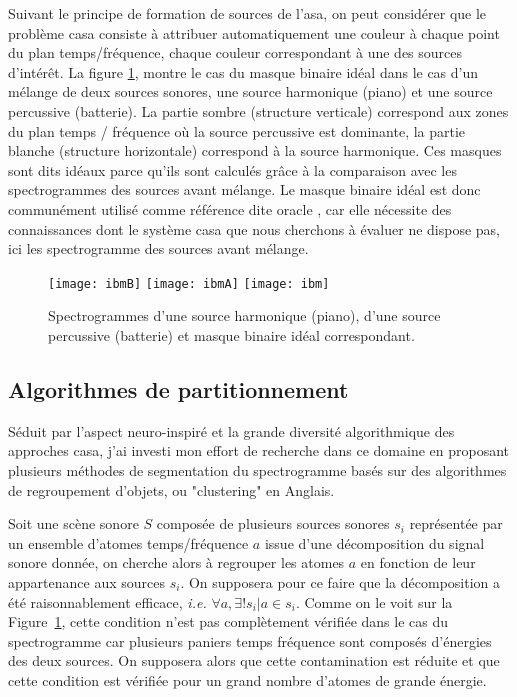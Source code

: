 Suivant le principe de formation de sources de l'asa, on peut considérer que le problème casa consiste à attribuer automatiquement une couleur à chaque point du plan temps/fréquence, chaque couleur correspondant à une des sources d'intérêt. La figure \ref{fig:ibm}, montre le cas du masque binaire idéal dans le cas d'un mélange de deux sources sonores, une source harmonique (piano) et une source percussive (batterie). La partie sombre (structure verticale) correspond aux zones du plan temps / fréquence où la source percussive est dominante, la partie blanche (structure horizontale) correspond à la source harmonique. Ces masques sont dits idéaux parce qu'ils sont calculés grâce à la comparaison avec les spectrogrammes des sources avant mélange. Le masque binaire idéal est donc communément utilisé comme référence dite \og oracle \fg, car elle nécessite des connaissances dont le système casa que nous cherchons à évaluer ne dispose pas, ici les spectrogramme des sources avant mélange.

  \begin{figure}
    \texttt{[image: ibmB]}
    \texttt{[image: ibmA]}
    \texttt{[image: ibm]}
    \caption{Spectrogrammes d'une source harmonique (piano), d'une source percussive (batterie) et masque binaire idéal correspondant.} \label{fig:ibm}
  \end{figure}

  \subsection{Algorithmes de partitionnement}

  Séduit par l'aspect neuro-inspiré et la grande diversité algorithmique des approches casa, j'ai investi mon effort de recherche dans ce domaine en proposant plusieurs méthodes de segmentation du spectrogramme basés sur des algorithmes de regroupement d'objets, ou "clustering" en Anglais.

  Soit une scène sonore $S$ composée de plusieurs sources sonores $s_i$ représentée par un ensemble d'atomes temps/fréquence $a$ issue d'une décomposition du signal sonore donnée, on cherche alors à regrouper les atomes $a$ en fonction de leur appartenance aux sources $s_i$. On supposera pour ce faire que la décomposition a été raisonnablement efficace, \textit{i.e.} $\forall a, \exists ! s_i | a \in s_i$. Comme on le voit sur la Figure~\ref{fig:ibm}, cette condition n'est pas complètement vérifiée dans le cas du spectrogramme car plusieurs paniers temps fréquence sont composés d'énergies des deux sources. On supposera alors que cette contamination est réduite et que cette condition est vérifiée pour un grand nombre d'atomes de grande énergie.

